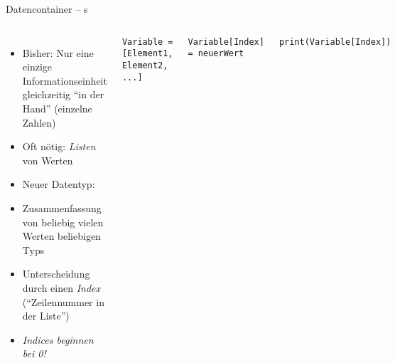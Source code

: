 
\begin{frame}[fragile]{Datencontainer -- s}
%
\begin{columns}
\begin{itemize}
\item Bisher: Nur eine einzige Informationseinheit gleichzeitig \enquote{in der Hand} (einzelne Zahlen)
\item Oft nötig: \emph{Listen} von Werten
\item Neuer Datentyp: 
\item Zusammenfassung von beliebig vielen Werten beliebigen Typs
\item Unterscheidung durch einen \emph{Index} (\enquote{Zeilennummer in der Liste})
\item \emph{Indices beginnen bei 0!}
\end{itemize}
%
\begin{codebox}
\begin{verbatim}
Variable = [Element1, Element2, ...]
\end{verbatim}
\end{codebox}
%
\begin{codebox}
\begin{verbatim}
Variable[Index] = neuerWert
\end{verbatim}
\end{codebox}
%
\begin{codebox}
\begin{verbatim}
print(Variable[Index])
\end{verbatim}
\end{codebox}
\end{columns}
%
\end{frame}


